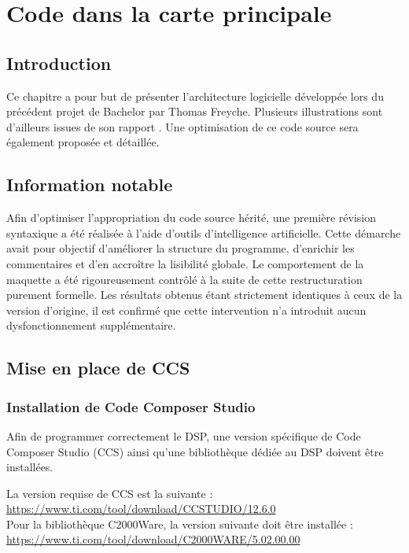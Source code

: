 \chapter{Code dans la carte principale}

\section{Introduction}
Ce chapitre a pour but de présenter l'architecture logicielle développée lors du précédent projet de Bachelor par Thomas Freyche. Plusieurs illustrations sont d'ailleurs issues de son rapport \cite{Freyche}. Une optimisation de ce code source sera également proposée et détaillée.

\section{Information notable}
Afin d'optimiser l'appropriation du code source hérité, une première révision syntaxique a été réalisée à l'aide d'outils d'intelligence artificielle. Cette démarche avait pour objectif d'améliorer la structure du programme, d'enrichir les commentaires et d'en accroître la lisibilité globale. Le comportement de la maquette a été rigoureusement contrôlé à la suite de cette restructuration purement formelle. Les résultats obtenus étant strictement identiques à ceux de la version d'origine, il est confirmé que cette intervention n'a introduit aucun dysfonctionnement supplémentaire.

\section{Mise en place de CCS}
\label{sec:MiseEnPlace}
\subsection{Installation de Code Composer Studio}
Afin de programmer correctement le DSP, une version spécifique de Code Composer Studio (CCS) ainsi qu'une bibliothèque dédiée au DSP doivent être installées.

La version requise de CCS est la suivante \cite{CCS_Install} :
\url{https://www.ti.com/tool/download/CCSTUDIO/12.6.0} \\

Pour la bibliothèque C2000Ware, la version suivante doit être installée \cite{C2000_Install} :
\url{https://www.ti.com/tool/download/C2000WARE/5.02.00.00}\\

